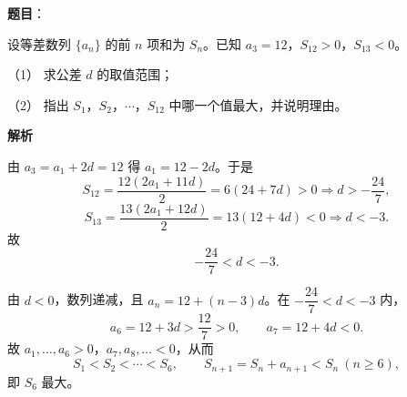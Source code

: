 \begin{answer}

\textbf{题目}：

设等差数列 \(\{a_n\}\) 的前 \(n\) 项和为 \(S_n\)。已知 \(a_3=12\)，\(S_{12}>0\)，\(S_{13}<0\)。

（1） 求公差 \(d\) 的取值范围；

（2） 指出 \(S_1\)，\(S_2\)，\(\cdots\)，\(S_{12}\) 中哪一个值最大，并说明理由。

\textbf{解析}


由 \(a_3=a_1+2d=12\) 得 \(a_1=12-2d\)。于是
\nopagebreak[4]
\[
S_{12}=\frac{12(2a_1+11d)}{2}=6(24+7d)>0
\Rightarrow d>-\frac{24}{7},
\]
\nopagebreak[4]
\[
S_{13}=\frac{13(2a_1+12d)}{2}=13(12+4d)<0
\Rightarrow d<-3.
\]
故
\nopagebreak[4]
\[
-\frac{24}{7}<d<-3.
\]


由 \(d<0\)，数列递减，且 \(a_n=12+(n-3)d\)。在 \(-\dfrac{24}{7}<d<-3\) 内，
\nopagebreak[4]
\[
a_6=12+3d>\frac{12}{7}>0,\qquad a_7=12+4d<0.
\]
故 \(a_1,\dots,a_6>0\)，\(a_7,a_8,\dots<0\)，从而
\nopagebreak[4]
\[
S_1<S_2<\cdots<S_6,\qquad S_{n+1}=S_n+a_{n+1}<S_n\ (n\geq6),
\]
即 \(S_6\) 最大。



\end{answer}
